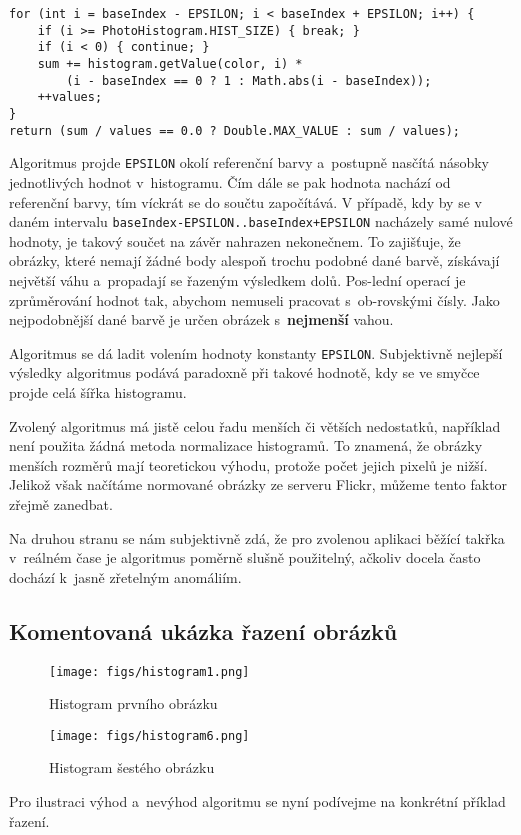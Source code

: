 \documentclass[12pt,oneside,a4paper]{article}
\newenvironment{listing}
{\begin{list}{}{\setlength{\leftmargin}{1em}}\item\scriptsize\bfseries}
{\end{list}}
\begin{document}
\begin{listing}
\begin{verbatim}
for (int i = baseIndex - EPSILON; i < baseIndex + EPSILON; i++) {
    if (i >= PhotoHistogram.HIST_SIZE) { break; }
    if (i < 0) { continue; }
    sum += histogram.getValue(color, i) *
        (i - baseIndex == 0 ? 1 : Math.abs(i - baseIndex));
    ++values;
}
return (sum / values == 0.0 ? Double.MAX_VALUE : sum / values);
\end{verbatim}
\end{listing}

Algoritmus projde \texttt{EPSILON} okolí referenční barvy a~postupně nasčítá násobky jednotlivých hodnot v~histogramu. Čím dále se pak hodnota nachází od referenční barvy, tím víckrát se do součtu započítává. V případě, kdy by se v daném intervalu \texttt{baseIndex-EPSILON..baseIndex+EPSILON} nacházely samé nulové hodnoty, je takový součet na závěr nahrazen nekonečnem. To zajišťuje, že obrázky, které nemají žádné body alespoň trochu podobné dané barvě, získávají největší váhu a~propadají se řazeným výsledkem dolů. Pos-lední operací je zprůměrování hodnot tak, abychom nemuseli pracovat s~ob-rovskými čísly. Jako nejpodobnější dané barvě je určen obrázek s~\textbf{nejmenší} vahou.

Algoritmus se dá ladit volením hodnoty konstanty \texttt{EPSILON}. Subjektivně nejlepší výsledky algoritmus podává paradoxně při takové hodnotě, kdy se ve smyčce projde celá šířka histogramu.

Zvolený algoritmus má jistě celou řadu menších či větších nedostatků, například není použita žádná metoda normalizace histogramů. To znamená, že obrázky menších rozměrů mají teoretickou výhodu, protože počet jejich pixelů je nižší. Jelikož však načítáme normované obrázky ze serveru Flickr, můžeme tento faktor zřejmě zanedbat.

Na druhou stranu se nám subjektivně zdá, že pro zvolenou aplikaci běžící takřka v~reálném čase je algoritmus poměrně slušně použitelný, ačkoliv docela často dochází k~jasně zřetelným anomáliím.

\subsection{Komentovaná ukázka řazení obrázků}

\begin{figure} \begin{center}
\texttt{[image: figs/histogram1.png]} \caption{Histogram prvního obrázku}
\label{fig:manchild}
\end{center} \end{figure}
\begin{figure} \begin{center}
\texttt{[image: figs/histogram6.png]} \caption{Histogram šestého obrázku}
\label{fig:borderflower}
\end{center} \end{figure}
Pro ilustraci výhod a~nevýhod algoritmu se nyní podívejme na konkrétní příklad řazení.
\end{document}
